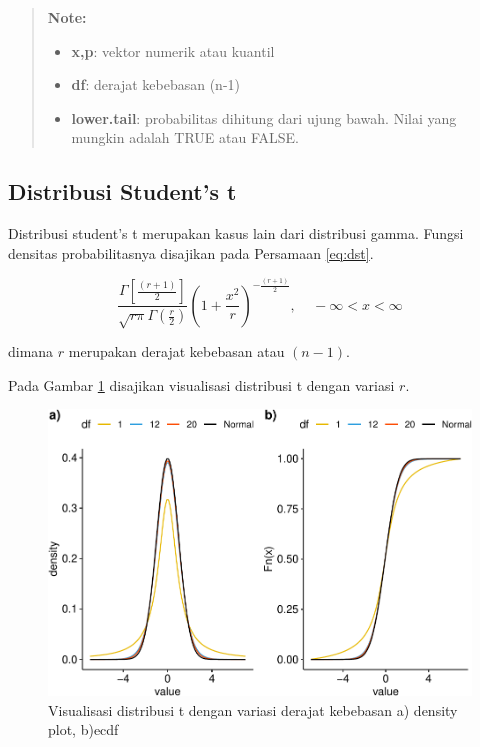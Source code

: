 \documentclass[]{book}
\providecommand{\tightlist}{%
  \setlength{\itemsep}{0pt}\setlength{\parskip}{0pt}}
\begin{document}
\begin{quote}
\textbf{Note: }

\begin{itemize}
\tightlist
\item
  \textbf{x,p}: vektor numerik atau kuantil
\item
  \textbf{df}: derajat kebebasan (n-1)
\item
  \textbf{lower.tail}: probabilitas dihitung dari ujung bawah. Nilai
  yang mungkin adalah TRUE atau FALSE.
\end{itemize}
\end{quote}

\subsection{Distribusi Student's t}\label{distribusi-students-t}

Distribusi student's t merupakan kasus lain dari distribusi gamma.
Fungsi densitas probabilitasnya disajikan pada Persamaan \eqref{eq:dst}.

\begin{equation}
   \frac{\Gamma\left[\frac{\left(r+1\right)}{2}\right]}{\sqrt{r\pi}\Gamma\left(\frac{r}{2}\right)}\left(1+\frac{x^2}{r}\right)^{-\frac{\left(r+1\right)}{2}},\ \ \ \ \ -\infty<x<\infty
  \label{eq:dst}
\end{equation}

dimana \(r\) merupakan derajat kebebasan atau \(\left(n-1\right)\).

Pada Gambar \ref{fig:dtvis} disajikan visualisasi distribusi t dengan
variasi \(r\).

\begin{figure}

{\centering \includegraphics[width=0.9\linewidth]{EnvStat_files/figure-latex/dtvis-1} 

}

\caption{Visualisasi distribusi t dengan variasi derajat kebebasan a) density plot, b)ecdf}\label{fig:dtvis}
\end{figure}
\end{document}
